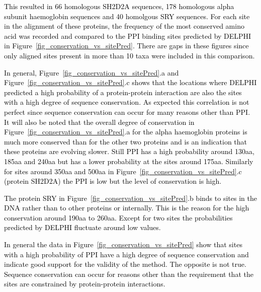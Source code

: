 \documentclass{bioinfo}
\newcommand{\mySecondColor}{black}
\begin{document}
\textcolor{\mySecondColor}{This resulted in 66 homologous SH2D2A sequences, 178 homologous alpha
subunit haemoglobin sequences and 40 homolgous SRY sequences.  For each
site in the alignment of these proteins, the frequency of the most
conserved amino acid was recorded and compared to the PPI binding sites predicted by
DELPHI in Figure~\ref{fig_conservation_vs_sitePred}.  There are gaps in these figures since only aligned
sites present in more than 10 taxa were included in this comparison.}

\textcolor{\mySecondColor}{In general, Figure~\ref{fig_conservation_vs_sitePred}.a and Figure~\ref{fig_conservation_vs_sitePred}.c shows that the locations where
DELPHI predicted a high probability of a protein-protein interaction are
also the sites with a high degree of sequence conservation.  As expected
this correlation is not perfect since sequence conservation can occur
for many reasons other than PPI.  It will also be noted that the overall
degree of conservation in Figure~\ref{fig_conservation_vs_sitePred}.a for the alpha haemoglobin proteins is
much more conserved than for the other two proteins and is an indication
that these proteins are evolving slower.  Still PPI has a high probability
around 130aa, 185aa and 240aa but has a lower probability at the sites
around 175aa.  Similarly for sites around 350aa and 500aa in Figure~\ref{fig_conservation_vs_sitePred}.c
(protein SH2D2A) the PPI is low but the level of conservation is high.}

\textcolor{\mySecondColor}{The protein SRY in Figure~\ref{fig_conservation_vs_sitePred}.b binds to sites in the DNA rather
than to other proteins or internally.  This is the reason for the
high conservation around 190aa to 260aa.  Except for two sites the
probabilities predicted by DELPHI fluctuate around low values.}

\textcolor{\mySecondColor}{In general the data in Figure~\ref{fig_conservation_vs_sitePred} show that sites with a high probability
of PPI have a high degree of sequence conservation and indicate good
support for the validity of the method.  The opposite is not true.
Sequence conservation can occur for reasons other than the requirement
that the sites are constrained by protein-protein interactions.}
\end{document}
